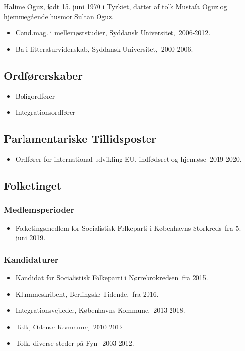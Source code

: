 \documentclass[11pt, a4paper]{awesome-cv}
\begin{document}
\makecvheader[R]
\makelettertitle
\begin{cvletter}
Halime Oguz, født 15. juni 1970 i Tyrkiet, datter af tolk Mustafa Oguz og hjemmegående husmor Sultan Oguz. 

\begin{itemize}
\item Cand.mag. i mellemøststudier, Syddansk Universitet, 2006-2012.
\item Ba i litteraturvidenskab, Syddansk Universitet, 2000-2006.
\end{itemize}
\subsection*{Ordførerskaber}
\begin{itemize}
\item Boligordfører
\item Integrationsordfører
\end{itemize}
\subsection*{Parlamentariske Tillidsposter}
\begin{itemize}
\item Ordfører for international udvikling EU, indfødsret og hjemløse 2019-2020.
\end{itemize}
\subsection*{Folketinget}
\subsubsection*{Medlemsperioder}
\begin{itemize}
\item Folketingsmedlem for Socialistisk Folkeparti i Københavns Storkreds fra 5. juni 2019.
\end{itemize}
\subsubsection*{Kandidaturer}
\begin{itemize}
\item Kandidat for Socialistisk Folkeparti i Nørrebrokredsen fra 2015.
\end{itemize}
\begin{itemize}
\item Klummeskribent, Berlingske Tidende, fra 2016.
\item Integrationsvejleder, Københavns Kommune, 2013-2018.
\item Tolk, Odense Kommune, 2010-2012.
\item Tolk, diverse steder på Fyn, 2003-2012.
\end{itemize}
\end{cvletter}
\end{document}
